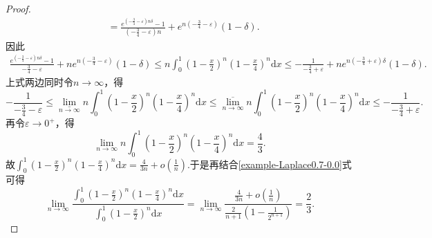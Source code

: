 \documentclass[../../main.tex]{subfiles}
\begin{document}
\begin{proof}
\begin{align*}
&=\frac{e^{\left( -\frac{3}{4}-\varepsilon \right) n\delta}-1}{\left( -\frac{3}{4}-\varepsilon \right) n}+e^{n\left( -\frac{3}{4}-\varepsilon \right)}\left( 1-\delta \right) .
\end{align*}
因此
\begin{align*}
\frac{e^{\left( -\frac{3}{4}-\varepsilon \right) n\delta}-1}{-\frac{3}{4}-\varepsilon}+ne^{n\left( -\frac{3}{4}-\varepsilon \right)}\left( 1-\delta \right) \leqslant n\int_0^1{\left( 1-\frac{x}{2} \right) ^n\left( 1-\frac{x}{4} \right) ^n\mathrm{d}x}\leqslant -\frac{1}{-\frac{3}{4}+\varepsilon}+ne^{n\left( -\frac{3}{4}+\varepsilon \right) \delta}\left( 1-\delta \right) .
\end{align*}
上式两边同时令$n\rightarrow \infty$，得
\[
-\frac{1}{-\frac{3}{4}-\varepsilon}\leqslant \underset{n\rightarrow \infty}{\underline{\lim }}n\int_0^1{\left( 1-\frac{x}{2} \right) ^n\left( 1-\frac{x}{4} \right) ^n\mathrm{d}x}\leqslant \underset{n\rightarrow \infty}{\overline{\lim }}n\int_0^1{\left( 1-\frac{x}{2} \right) ^n\left( 1-\frac{x}{4} \right) ^n\mathrm{d}x}\leqslant -\frac{1}{-\frac{3}{4}+\varepsilon}.
\]
再令$\varepsilon \rightarrow 0^+$，得
\[
\lim\limits_{n\rightarrow \infty}n\int_0^1{\left( 1-\frac{x}{2} \right) ^n\left( 1-\frac{x}{4} \right) ^n\mathrm{d}x}=\frac{4}{3}.
\]
故$\int_0^1{\left( 1-\frac{x}{2} \right) ^n\left( 1-\frac{x}{4} \right) ^n\mathrm{d}x}=\frac{4}{3n}+o\left( \frac{1}{n} \right) .$于是再结合\eqref{example-Laplace0.7-0.0}式可得
\[
\lim_{n\rightarrow \infty} \frac{\int_0^1{\left( 1-\frac{x}{2} \right) ^n\left( 1-\frac{x}{4} \right) ^n\mathrm{d}x}}{\int_0^1{\left( 1-\frac{x}{2} \right) ^n\mathrm{d}x}}=\lim_{n\rightarrow \infty} \frac{\frac{4}{3n}+o\left( \frac{1}{n} \right)}{\frac{2}{n+1}\left( 1-\frac{1}{2^{n+1}} \right)}=\frac{2}{3}.
\]
\end{proof}
\end{document}
